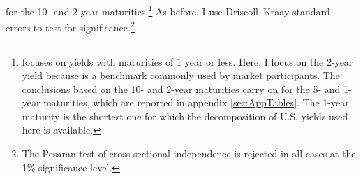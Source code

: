 {for the 10- and 2-year maturities.\footnote{ \cite{Kalemli-Ozcan:2019} focuses on yields with maturities of 1 year or less. Here, I focus on the 2-year yield because is a benchmark commonly used by market participants. The conclusions based on the 10- and 2-year maturities carry on for the 5- and 1-year maturities, which are reported in appendix \ref{sec:AppTables}. The 1-year maturity is the shortest one for which the decomposition of U.S. yields used here is available.}
As before, I use Driscoll--Kraay standard errors to test for significance.\footnote{ The Pesaran test of cross-sectional independence is rejected in all cases at the 1\% significance level.} %


}
